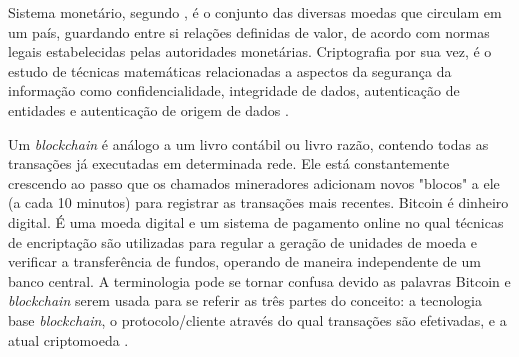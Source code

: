 \documentclass[
	article,			%
	11pt,				%
	oneside,			%
	a4paper,			%
	chapter=TITLE,		%
	section=TITLE,		%
	subsection=TITLE,	%
	subsubsection=TITLE, %
	english,			%
	brazil,				%
	sumario=tradicional
	]{ifrs-artigo-abntex2}
\begin{document}
Sistema monetário, segundo , é o conjunto das diversas moedas que circulam em um país, guardando entre si relações definidas de valor, de acordo com normas legais estabelecidas pelas autoridades monetárias.
Criptografia por sua vez, é o estudo de técnicas matemáticas relacionadas a aspectos da segurança da informação como confidencialidade, integridade de dados, autenticação de entidades e autenticação de origem de dados \cite{katz1996handbook}.

Um \textit{blockchain} é análogo a um livro contábil ou livro razão, contendo todas as transações já executadas em determinada rede. Ele está constantemente crescendo ao passo que os chamados mineradores adicionam novos "blocos" a ele (a cada 10 minutos) para registrar as transações mais recentes.
Bitcoin é dinheiro digital. É uma moeda digital e um sistema de pagamento online no qual técnicas de encriptação são utilizadas para regular a geração de unidades de moeda e verificar a transferência de fundos, operando de maneira independente de um banco central. A terminologia pode se tornar confusa devido as palavras Bitcoin e \textit{blockchain} serem usada para se referir as três partes do conceito: a tecnologia base \textit{blockchain}, o protocolo/cliente através do qual transações são efetivadas, e a  atual criptomoeda \cite{swan2015blockchain}.
\end{document}
